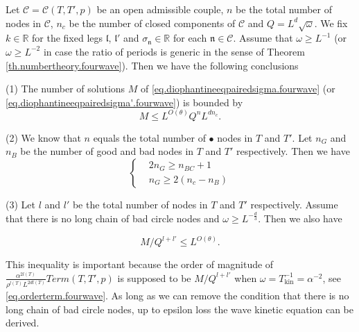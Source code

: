 \begin{prop}\label{prop.counting.fourwave}
Let $\mathcal{C}=\mathcal{C}(T,T',p)$ be an open admissible couple, $n$ be the total number of nodes in $\mathcal{C}$, $n_c$ be the number of closed components of $\mathcal{C}$ and $Q=L^{d}\sqrt{\omega}$. We fix $k\in \mathbb{R}$ for the fixed legs $\mathfrak{l}$, $\mathfrak{l}'$ and $\sigma_{\mathfrak{n}}\in\mathbb{R}$ for each $\mathfrak{n}\in \mathcal{C}$. Assume that $\omega\ge L^{-1}$ (or $\omega\ge L^{-2}$ in case the ratio of periods is generic in the sense of Theorem \ref{th.numbertheory.fourwave}). Then we have the following conclusions

(1) The number of solutions $M$ of \eqref{eq.diophantineeqpairedsigma.fourwave} (or \eqref{eq.diophantineeqpairedsigma'.fourwave}) is bounded by 
\begin{equation}\label{eq.countingbd0.fourwave}
    M\leq L^{O(\theta)} Q^{n} L^{dn_c}.
\end{equation}

(2) We know that $n$ equals the total number of $\bullet$ nodes in $T$ and $T'$. Let $n_G$ and $n_B$ be the number of good and bad nodes in $T$ and $T'$ respectively. Then we have 
\begin{equation}\label{eq.ineqn_Gn_B.fourwave}
    \left\{\begin{aligned}
        & 2n_G \ge n_{BC}+1
        \\
        & n_G \ge 2(n_c - n_B)
    \end{aligned}\right.
\end{equation}




(3) Let $l$ and $l'$ be the total number of nodes in $T$ and $T'$ respectively. Assume that there is no long chain of bad circle nodes and $\omega \ge L^{-\frac{d}{3}}$. Then we also have 

\begin{equation}\label{eq.countingbd1.fourwave}
    M/Q^{l+l'}\leq L^{O(\theta)}. 
\end{equation}

This inequality is important because the order of magnitude of $\frac{\alpha^{2l(T)}}{\rho^{l(T)}L^{2dl(T)}}Term(T,T',p)$ is supposed to be  $M/Q^{l+l'}$ when $\omega=T_{\text{kin}}^{-1} = \alpha^{-2}$, see \eqref{eq.orderterm.fourwave}. As long as we can remove the condition that there is no long chain of bad circle nodes, up to epsilon loss the wave kinetic equation can be derived.

\end{prop}
